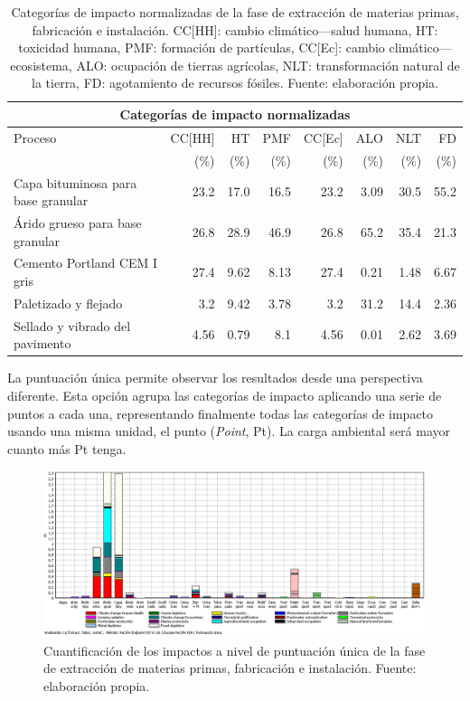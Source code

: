 \begin{table}[!htb]
\centering
\begin{tabular}{p{4cm}rrrrrrr}
\toprule
\multicolumn{8}{c}{Categorías de impacto normalizadas}\\
\midrule
Proceso & CC[HH] & HT & PMF & CC[Ec] & ALO & NLT & FD\\
 &  (\%) & (\%) & (\%) & (\%) & (\%) & (\%) & (\%)\\
\midrule
Capa bituminosa para base granular & 23.2 & 17.0 & 16.5 & 23.2 & 3.09 & 30.5 & 55.2\\
Árido grueso para base granular & 26.8 & 28.9 & 46.9 & 26.8 & 65.2 & 35.4 & 21.3\\
Cemento Portland CEM I gris & 27.4 & 9.62 & 8.13 & 27.4 & 0.21 & 1.48 & 6.67\\
Paletizado y flejado & 3.2 & 9.42 & 3.78 & 3.2 & 31.2 & 14.4 & 2.36\\
Sellado y vibrado del pavimento & 4.56 & 0.79 & 8.1 & 4.56 & 0.01 & 2.62 & 3.69\\
\bottomrule
\end{tabular}
\caption[Categorías de impacto normalizadas de la fase de extracción de materias primas, fabricación e instalación.]{Categorías de impacto normalizadas de la fase de extracción de materias primas, fabricación e instalación. CC[HH]: cambio climático—salud humana, HT: toxicidad humana, PMF: formación de partículas, CC[Ec]: cambio climático—ecosistema, ALO: ocupación de tierras agrícolas, NLT: transformación natural de la tierra, FD: agotamiento de recursos fósiles. Fuente: elaboración propia.}
\label{categoriasimpactofabricacion}
\end{table}

La puntuación única permite observar los resultados desde una perspectiva diferente. Esta opción agrupa las categorías de impacto aplicando una serie de puntos a cada una, representando finalmente todas las categorías de impacto usando una misma unidad, el punto (\textit{Point}, Pt). La carga ambiental será mayor cuanto más Pt tenga.

\begin{figure}[!htb]
\centering
\includegraphics[width=15cm]{img/fabric_puntuacionunica.png}
\caption[Cuantificación de los impactos a nivel de puntuación única de la fase de extracción de materias primas, fabricación e instalación.]{Cuantificación de los impactos a nivel de puntuación única de la fase de extracción de materias primas, fabricación e instalación. Fuente: elaboración propia.}
\label{fig:fabric_puntuacionunica}
\end{figure}

